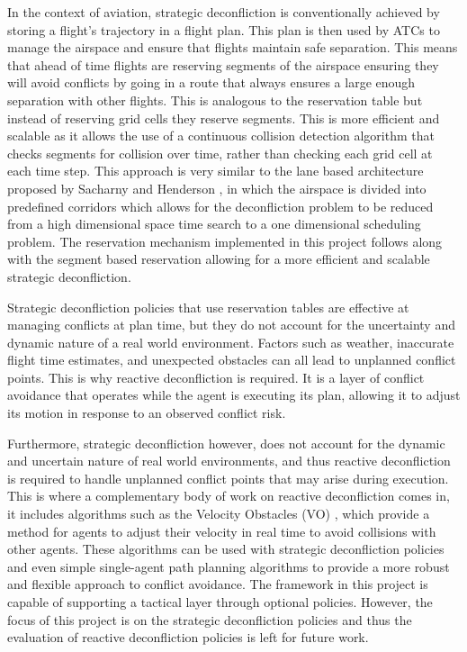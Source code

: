 In the context of aviation, strategic deconfliction is conventionally achieved by storing a flight's trajectory in a flight plan. This plan is then used by ATCs to manage the airspace and ensure that flights maintain safe separation. This means that ahead of time flights are reserving segments of the airspace ensuring they will avoid conflicts by going in a route that always ensures a large enough separation with other flights. This is analogous to the reservation table but instead of reserving grid cells they reserve segments. This is more efficient and scalable as it allows the use of a continuous collision detection algorithm that checks segments for collision over time, rather than checking each grid cell at each time step. This approach is very similar to the lane based architecture proposed by Sacharny and Henderson \cite{sacharny2019lanebased}, in which the airspace is divided into predefined corridors which allows for the deconfliction problem to be reduced from a high dimensional space time search to a one dimensional scheduling problem. The reservation mechanism implemented in this project follows along with the segment based reservation allowing for a more efficient and scalable strategic deconfliction. \par

\vspace{1em}

Strategic deconfliction policies that use reservation tables are effective at managing conflicts at plan time, but they do not account for the uncertainty and dynamic nature of a real world environment. Factors such as weather, inaccurate flight time estimates, and unexpected obstacles can all lead to unplanned conflict points. This is why reactive deconfliction is required. It is a layer of conflict avoidance that operates while the agent is executing its plan, allowing it to adjust its motion in response to an observed conflict risk. \par

\vspace{1em}

Furthermore, strategic deconfliction however, does not account for the dynamic and uncertain nature of real world environments, and thus reactive deconfliction is required to handle unplanned conflict points that may arise during execution. This is where a complementary body of work on reactive deconfliction comes in, it includes algorithms such as the Velocity Obstacles (VO) \cite{fiorini1998vo}, which provide a method for agents to adjust their velocity in real time to avoid collisions with other agents. These algorithms can be used with strategic deconfliction policies and even simple single-agent path planning algorithms to provide a more robust and flexible approach to conflict avoidance. The framework in this project is capable of supporting a tactical layer through optional policies. However, the focus of this project is on the strategic deconfliction policies and thus the evaluation of reactive deconfliction policies is left for future work. \par 

